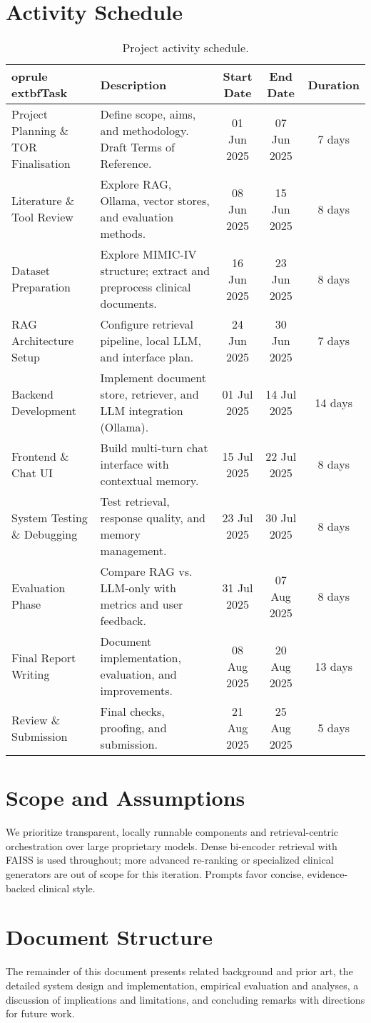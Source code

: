 \section{Activity Schedule}
\begin{table*}[ht]
\centering
\begin{tabularx}{\textwidth}{l X c c c}
	oprule
	extbf{Task} & \textbf{Description} & \textbf{Start Date} & \textbf{End Date} & \textbf{Duration} \\
\midrule
Project Planning \& TOR Finalisation & Define scope, aims, and methodology. Draft Terms of Reference. & 01 Jun 2025 & 07 Jun 2025 & 7 days \\
Literature \& Tool Review & Explore RAG, Ollama, vector stores, and evaluation methods. & 08 Jun 2025 & 15 Jun 2025 & 8 days \\
Dataset Preparation & Explore MIMIC-IV structure; extract and preprocess clinical documents. & 16 Jun 2025 & 23 Jun 2025 & 8 days \\
RAG Architecture Setup & Configure retrieval pipeline, local LLM, and interface plan. & 24 Jun 2025 & 30 Jun 2025 & 7 days \\
Backend Development & Implement document store, retriever, and LLM integration (Ollama). & 01 Jul 2025 & 14 Jul 2025 & 14 days \\
Frontend \& Chat UI & Build multi-turn chat interface with contextual memory. & 15 Jul 2025 & 22 Jul 2025 & 8 days \\
System Testing \& Debugging & Test retrieval, response quality, and memory management. & 23 Jul 2025 & 30 Jul 2025 & 8 days \\
Evaluation Phase & Compare RAG vs. LLM-only with metrics and user feedback. & 31 Jul 2025 & 07 Aug 2025 & 8 days \\
Final Report Writing & Document implementation, evaluation, and improvements. & 08 Aug 2025 & 20 Aug 2025 & 13 days \\
Review \& Submission & Final checks, proofing, and submission. & 21 Aug 2025 & 25 Aug 2025 & 5 days \\
\bottomrule
\end{tabularx}
\caption{Project activity schedule.}
\end{table*}

\section{Scope and Assumptions}
We prioritize transparent, locally runnable components and retrieval-centric orchestration over large proprietary models. Dense bi-encoder retrieval with FAISS is used throughout; more advanced re-ranking or specialized clinical generators are out of scope for this iteration. Prompts favor concise, evidence-backed clinical style.

\section{Document Structure}
The remainder of this document presents related background and prior art, the detailed system design and implementation, empirical evaluation and analyses, a discussion of implications and limitations, and concluding remarks with directions for future work.
